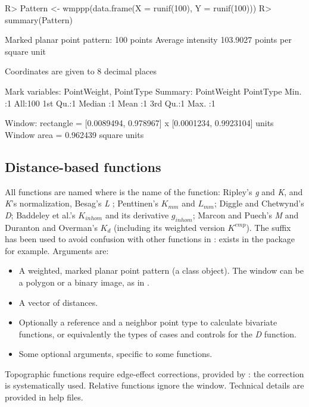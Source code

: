 \documentclass[nojss]{jss}
\begin{document}
\begin{Schunk}
\begin{Sinput}
R> Pattern <- wmppp(data.frame(X = runif(100), Y = runif(100)))
R> summary(Pattern)
\end{Sinput}
\begin{Soutput}
Marked planar point pattern:  100 points
Average intensity 103.9027 points per square unit

Coordinates are given to 8 decimal places

Mark variables: PointWeight, PointType
Summary:
  PointWeight PointType
 Min.   :1    All:100  
 1st Qu.:1             
 Median :1             
 Mean   :1             
 3rd Qu.:1             
 Max.   :1             

Window: rectangle = [0.0089494, 0.978967] x [0.0001234, 0.9923104] 
units
Window area = 0.962439 square units
\end{Soutput}
\end{Schunk}

\subsection{Distance-based functions}
All functions are named  where  is the name of the function: 
Ripley's \emph{g} and \emph{K}, and \emph{K}'s normalization, Besag's \emph{L} \citeyearpar{Besag1977}; 
Penttinen's $K_{mm}$ and $L_{mm}$; 
Diggle and Chetwynd's \emph{D}; 
Baddeley et al.'s $K_{inhom}$ and its derivative $g_{inhom}$; 
Marcon and Puech's \emph{M}
and Duranton and Overman's $K_d$ (including its weighted version $K^{emp}$). The suffix  has been used to avoid confusion with other functions in :  exists in the  package for example.
Arguments are:
\begin{itemize}
\item A weighted, marked planar point pattern (a  class object). The window can be a polygon or a binary image, as in .
\item A vector of distances.
\item Optionally a reference and a neighbor point type to calculate bivariate functions, or equivalently the types of cases and controls for the \emph{D} function.
\item Some optional arguments, specific to some functions.
\end{itemize}

Topographic functions require edge-effect corrections, provided by : the  correction is systematically used. Relative functions ignore the window. Technical details are provided in help files.
\end{document}
